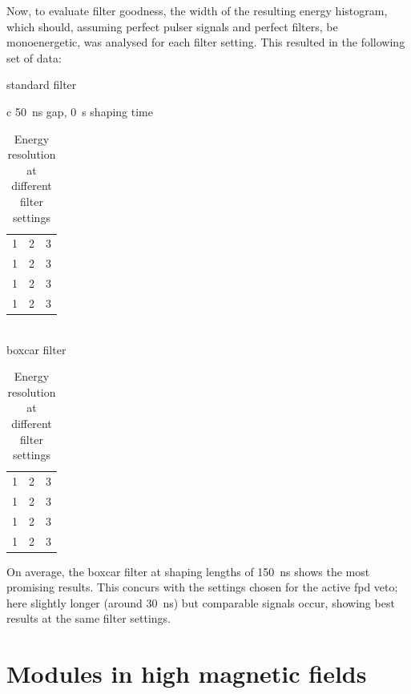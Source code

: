  Now, to evaluate filter goodness, the width of the resulting energy histogram, which should, assuming perfect pulser signals and perfect filters, be monoenergetic, was analysed for each filter setting. This resulted in the following set of data:
  
  \begin{table}
	\caption{Energy resolution at different filter settings}
	\centering
	standard filter
	\begin{tabular}{c}
	\SI{50}{\nano\second} gap, \SI{0}{\second} shaping time\\
	
  	\begin{tabular}{ccc}
  		1& 2& 3\\
  		1& 2& 3\\
  		1& 2& 3\\
  		1& 2& 3\\
  	\end{tabular}
  	\end{tabular}\\
  	boxcar filter
  	\begin{tabular}{ccc}
  		1& 2& 3\\
  		1& 2& 3\\
  		1& 2& 3\\
  		1& 2& 3\\
  	\end{tabular}

  \end{table}
  On average, the boxcar filter at shaping lengths  of \SI{150}{\nano\second} shows the most promising results. This concurs with the settings chosen for the active fpd veto; here slightly longer (around \SI{30}{\nano\second}) but comparable signals occur, showing best results at the same filter settings\cite{KevinWierman}.
  
  \section{Modules in high magnetic fields}
  \label{ch:Analysis:sec:Modules in high magnetic fields}
  
